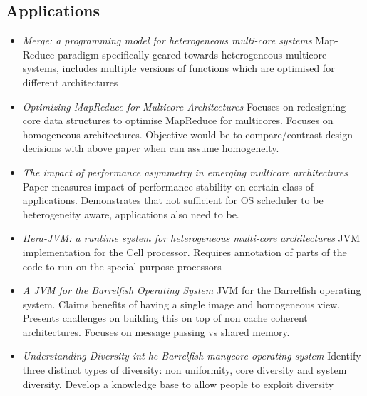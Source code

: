 \subsection{Applications}
\begin{itemize}
\item \emph{Merge: a programming model for heterogeneous multi-core systems}
Map-Reduce paradigm specifically geared towards heterogeneous multicore systems,
includes multiple versions of functions which are optimised for different architectures
\item \emph{Optimizing MapReduce for Multicore Architectures} Focuses on redesigning
core data structures to optimise MapReduce for multicores. Focuses on homogeneous
architectures. Objective would be to compare/contrast design decisions with
above paper when can assume homogeneity.
\item \emph{The impact of performance asymmetry in emerging multicore architectures}
Paper measures impact of performance stability on certain class of applications.
Demonstrates that not sufficient for OS scheduler to be heterogeneity aware,
applications also need to be. 
\item \emph{Hera-JVM: a runtime system for heterogeneous multi-core 
architectures} JVM implementation for the Cell processor. Requires annotation
of parts of the code to run on the special purpose processors
\item \emph{A JVM for the Barrelfish Operating System} JVM for the Barrelfish
operating system. Claims benefits of having a single image and homogeneous view. 
Presents challenges on building this on top of non cache coherent architectures.
Focuses on message passing vs shared memory. 
\item \emph{Understanding Diversity int he Barrelfish manycore operating system}
Identify three distinct types of diversity: non uniformity, core diversity and 
system diversity. Develop a knowledge base to allow people to exploit
diversity
\end{itemize}

